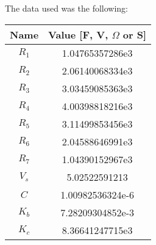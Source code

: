 The data used was the following:

\begin{center}
  \begin{tabular}{ | c | c | }
    \hline    
    {\bf Name} & {\bf Value [F, V, $\Omega$ or S]} \\ \hline
    $R_1$ & 1.04765357286e3 \\ \hline 
    $R_2$ & 2.06140068334e3 \\ \hline 
    $R_3$ & 3.03459085363e3 \\ \hline 
    $R_4$ & 4.00398818216e3 \\ \hline 
    $R_5$ & 3.11499853456e3 \\ \hline 
    $R_6$ & 2.04588646991e3 \\ \hline 
    $R_7$ & 1.04390152967e3 \\ \hline 
    $V_s$ & 5.02522591213 \\ \hline 
    $C$ & 1.00982536324e-6 \\ \hline
    $K_b$ & 7.28209304852e-3 \\ \hline
    $K_c$ & 8.36641247715e3 \\ 
    \hline
  \end{tabular}
\end{center}



